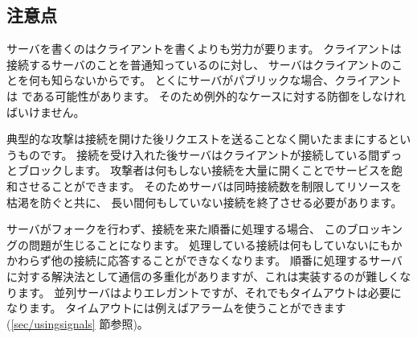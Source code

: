 \subsection*{注意点}

サーバを書くのはクライアントを書くよりも労力が要ります。
クライアントは接続するサーバのことを普通知っているのに対し、
サーバはクライアントのことを何も知らないからです。
とくにサーバがパブリックな場合、クライアントは  である可能性があります。
そのため例外的なケースに対する防御をしなければいけません。

典型的な攻撃は接続を開けた後リクエストを送ることなく開いたままにするというものです。
接続を受け入れた後サーバはクライアントが接続している間ずっとブロックします。
攻撃者は何もしない接続を大量に開くことでサービスを飽和させることができます。
そのためサーバは同時接続数を制限してリソースを枯渇を防ぐと共に、
長い間何もしていない接続を終了させる必要があります。


サーバがフォークを行わず、接続を来た順番に処理する場合、
このブロッキングの問題が生じることになります。
処理している接続は何もしていないにもかかわらず他の接続に応答することができなくなります。
順番に処理するサーバに対する解決法として通信の多重化がありますが、これは実装するのが難しくなります。
並列サーバはよりエレガントですが、それでもタイムアウトは必要になります。
タイムアウトには例えばアラームを使うことができます(\ref{sec/usingsignals} 節参照)。

